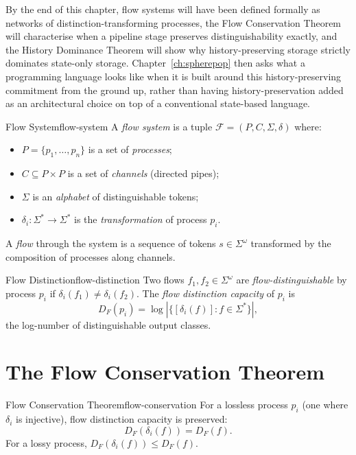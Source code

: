 \documentclass[12pt,twoside,openright]{book}
\begin{document}
By the end of this chapter, flow systems will have been
defined formally as networks of distinction-transforming
processes, the Flow Conservation Theorem will characterise
when a pipeline stage preserves distinguishability exactly,
and the History Dominance Theorem will show why
history-preserving storage strictly dominates state-only
storage. Chapter~\ref{ch:spherepop} then asks what a
programming language looks like when it is built around this
history-preserving commitment from the ground up, rather than
having history-preservation added as an architectural choice
on top of a conventional state-based language.

\begin{definition}{Flow System}{flow-system}
  A \emph{flow system} is a tuple
  $\mathcal{F} = (P, C, \Sigma, \delta)$ where:
  \begin{itemize}[nosep]
    \item $P = \{p_1, \ldots, p_n\}$ is a set of
          \emph{processes};
    \item $C \subseteq P \times P$ is a set of
          \emph{channels} (directed pipes);
    \item $\Sigma$ is an \emph{alphabet} of distinguishable
          tokens;
    \item $\delta_i : \Sigma^* \to \Sigma^*$ is the
          \emph{transformation} of process $p_i$.
  \end{itemize}
  A \emph{flow} through the system is a sequence of tokens
  $s \in \Sigma^\omega$ transformed by the composition of
  processes along channels.
\end{definition}

\begin{definition}{Flow Distinction}{flow-distinction}
  Two flows $f_1, f_2 \in \Sigma^\omega$ are
  \emph{flow-distinguishable} by process $p_i$ if
  $\delta_i(f_1) \ne \delta_i(f_2)$.
  The \emph{flow distinction capacity} of $p_i$ is
  \[
    D_F(p_i) = \log|\{[\delta_i(f)] : f \in \Sigma^*\}|,
  \]
  the log-number of distinguishable output classes.
\end{definition}

\section{The Flow Conservation Theorem}

\begin{theorem}{Flow Conservation Theorem}{flow-conservation}
  For a lossless process $p_i$ (one where $\delta_i$ is
  injective), flow distinction capacity is preserved:
  \[
    D_F(\delta_i(f)) = D_F(f).
  \]
  For a lossy process, $D_F(\delta_i(f)) \le D_F(f)$.
\end{theorem}
\end{document}
